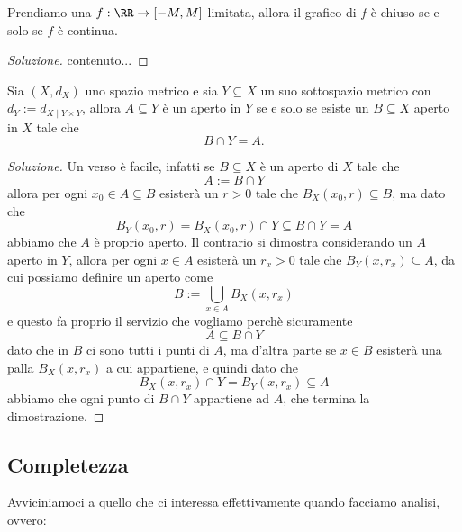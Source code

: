 \documentclass[11pt]{scrartcl}
\begin{document}
	\begin{problem}
		Prendiamo una $f:\RR\to [-M,M]$ limitata, allora il grafico di $f$ è chiuso se e solo se $f$ è continua.
	\end{problem}
	\begin{proof}[Soluzione]
		contenuto...
	\end{proof}
	\begin{problem}
		Sia $(X,d_X)$ uno spazio metrico e sia $Y\subseteq X$ un suo sottospazio metrico con $d_Y:=d_{X\mid Y\times Y}$, allora $A\subseteq Y$ è un aperto in $Y$ se e solo se esiste un $B\subseteq X$ aperto in $X$ tale che
		$$B\cap Y=A.$$ 
	\end{problem}
	\begin{proof}[Soluzione]
		Un verso è facile, infatti se $B\subseteq X$ è un aperto di $X$ tale che
		$$A:=B\cap Y$$
		allora per ogni $x_0\in A\subseteq B$ esisterà un $r>0$ tale che $B_X(x_0,r)\subseteq B$, ma dato che
		$$B_Y(x_0,r)=B_X(x_0,r)\cap Y \subseteq B\cap Y = A$$
		abbiamo che $A$ è proprio aperto. Il contrario si dimostra considerando un $A$ aperto in $Y$, allora per ogni $x\in A $ esisterà un $r_x>0$ tale che $B_Y(x,r_x)\subseteq A$, da cui possiamo definire un aperto come
		$$B:=\bigcup_{x\in A}B_X(x,r_x)$$
		e questo fa proprio il servizio che vogliamo perchè sicuramente 
		$$A\subseteq B\cap Y$$
		dato che in $B$ ci sono tutti i punti di $A$, ma d'altra parte se $x\in B$ esisterà una palla $B_X(x,r_x)$ a cui appartiene, e quindi dato che
		$$B_X(x,r_x)\cap Y = B_Y(x,r_x)\subseteq A$$
		abbiamo che ogni punto di $B\cap Y$ appartiene ad $A$, che termina la dimostrazione. 
	\end{proof}
	
	\subsection{Completezza}
	
	Avviciniamoci a quello che ci interessa effettivamente quando facciamo analisi, ovvero:
	
\end{document}
